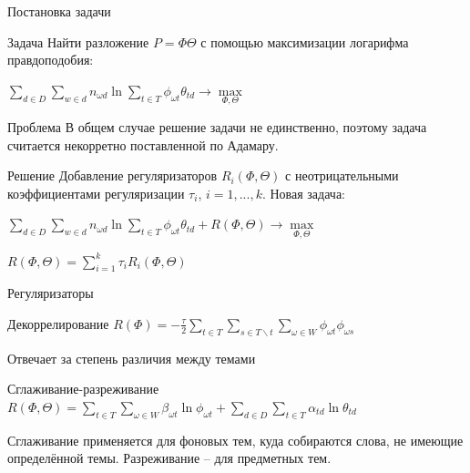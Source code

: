\documentclass{beamer}
\begin{document}
\begin{frame}{Постановка задачи}
\begin{block}{Задача}
Найти разложение $P = \Phi\Theta$ с помощью максимизации логарифма правдоподобия:

$\sum\limits_{d \in D}\sum\limits_{w \in d}n_{\omega d}\ln\sum\limits_{t \in T}\phi_{\omega t}\theta_{td} \to \max\limits_{\Phi, \Theta}$
\end{block}

\begin{block}{Проблема}
В общем случае решение задачи не единственно, поэтому задача считается некорретно поставленной по Адамару.
\end{block}

\begin{block}{Решение}
Добавление регуляризаторов $R_i(\Phi, \Theta)$ с неотрицательными коэффициентами регуляризации $\tau_i$, $i = 1, ..., k$. Новая задача:

$\sum\limits_{d \in D}\sum\limits_{w \in d}n_{\omega d}\ln\sum\limits_{t \in T}\phi_{\omega t}\theta_{td} + R(\Phi, \Theta) \to \max\limits_{\Phi, \Theta}$ 

$R(\Phi, \Theta) = \sum\limits_{i = 1}^k\tau_i R_i(\Phi, \Theta)$
\end{block}
\end{frame}

\begin{frame}{Регуляризаторы}
\begin{block}{Декоррелирование}
$R(\Phi) = -\frac{\tau}{2}\sum\limits_{t \in T}\sum\limits_{s \in T\backslash t}\sum\limits_{\omega \in W}\phi_{\omega t}\phi_{\omega s}$

Отвечает за степень различия между темами
\end{block}

\begin{block}{Сглаживание-разреживание}
$R(\Phi, \Theta) = \sum\limits_{t \in T}\sum\limits_{\omega \in W}\beta_{\omega t}\ln\phi_{\omega t} + \sum\limits_{d \in D}\sum\limits_{t \in T}\alpha_{td}\ln\theta_{td}$

Сглаживание применяется для фоновых тем, куда собираются слова, не имеющие определённой темы. Разреживание -- для предметных тем.
\end{block}
\end{frame}
\end{document}
